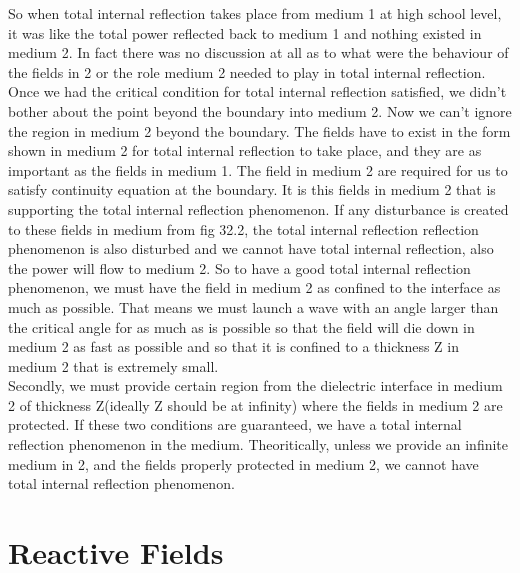 So when total internal reflection takes place from medium 1 at high school level, it was like the total power reflected back to medium 1 and nothing existed in medium 2. In fact there was no discussion at all as to what were the behaviour of the fields in 2 or the role medium 2 needed to play in total internal reflection. Once we had the critical condition for total internal reflection satisfied, we didn't bother about the point beyond the boundary into medium 2. Now we can't ignore the region in medium 2 beyond the boundary. The fields have to exist in the form shown in medium 2 for total internal reflection to take place, and they are as important as the fields in medium 1. The field in medium 2 are required for us to satisfy continuity equation at the boundary. It is this fields in medium 2 that is supporting the total internal reflection phenomenon. If any disturbance is created to these fields in medium from fig 32.2, the total internal reflection reflection phenomenon is also disturbed and we cannot have total internal reflection, also the power will flow to medium 2. So to have a good total internal reflection phenomenon, we must have the field in medium 2 as confined to the interface as much as possible. That means we must launch a wave with an angle larger than the critical angle for as much as is possible so that the field will die down in medium 2 as fast as possible and so that it is confined to a thickness Z in medium 2 that is extremely small.\\
	Secondly, we must provide certain region from the dielectric interface in medium 2 of thickness Z(ideally Z should be at infinity) where the fields in medium 2 are protected. If these two conditions are guaranteed, we have a total internal reflection phenomenon in the medium. Theoritically, unless we provide an infinite medium in 2, and the fields properly protected in medium 2, we cannot have total internal reflection phenomenon.\\
\section{Reactive Fields}
